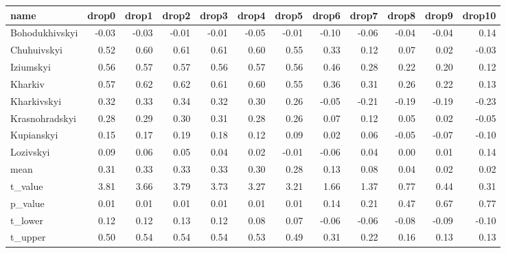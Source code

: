 \begin{table}[ht]
\centering
\begin{tabular}{lrrrrrrrrrrr}
  \hline
name & drop0 & drop1 & drop2 & drop3 & drop4 & drop5 & drop6 & drop7 & drop8 & drop9 & drop10 \\ 
  \hline
Bohodukhivskyi & -0.03 & -0.03 & -0.01 & -0.01 & -0.05 & -0.01 & -0.10 & -0.06 & -0.04 & -0.04 & 0.14 \\ 
  Chuhuivskyi & 0.52 & 0.60 & 0.61 & 0.61 & 0.60 & 0.55 & 0.33 & 0.12 & 0.07 & 0.02 & -0.03 \\ 
  Iziumskyi & 0.56 & 0.57 & 0.57 & 0.56 & 0.57 & 0.56 & 0.46 & 0.28 & 0.22 & 0.20 & 0.12 \\ 
  Kharkiv & 0.57 & 0.62 & 0.62 & 0.61 & 0.60 & 0.55 & 0.36 & 0.31 & 0.26 & 0.22 & 0.13 \\ 
  Kharkivskyi & 0.32 & 0.33 & 0.34 & 0.32 & 0.30 & 0.26 & -0.05 & -0.21 & -0.19 & -0.19 & -0.23 \\ 
  Krasnohradskyi & 0.28 & 0.29 & 0.30 & 0.31 & 0.28 & 0.26 & 0.07 & 0.12 & 0.05 & 0.02 & -0.05 \\ 
  Kupianskyi & 0.15 & 0.17 & 0.19 & 0.18 & 0.12 & 0.09 & 0.02 & 0.06 & -0.05 & -0.07 & -0.10 \\ 
  Lozivskyi & 0.09 & 0.06 & 0.05 & 0.04 & 0.02 & -0.01 & -0.06 & 0.04 & 0.00 & 0.01 & 0.14 \\ 
  mean & 0.31 & 0.33 & 0.33 & 0.33 & 0.30 & 0.28 & 0.13 & 0.08 & 0.04 & 0.02 & 0.02 \\ 
  t\_value & 3.81 & 3.66 & 3.79 & 3.73 & 3.27 & 3.21 & 1.66 & 1.37 & 0.77 & 0.44 & 0.31 \\ 
  p\_value & 0.01 & 0.01 & 0.01 & 0.01 & 0.01 & 0.01 & 0.14 & 0.21 & 0.47 & 0.67 & 0.77 \\ 
  t\_lower & 0.12 & 0.12 & 0.13 & 0.12 & 0.08 & 0.07 & -0.06 & -0.06 & -0.08 & -0.09 & -0.10 \\ 
  t\_upper & 0.50 & 0.54 & 0.54 & 0.54 & 0.53 & 0.49 & 0.31 & 0.22 & 0.16 & 0.13 & 0.13 \\ 
   \hline
\end{tabular}
\end{table}
